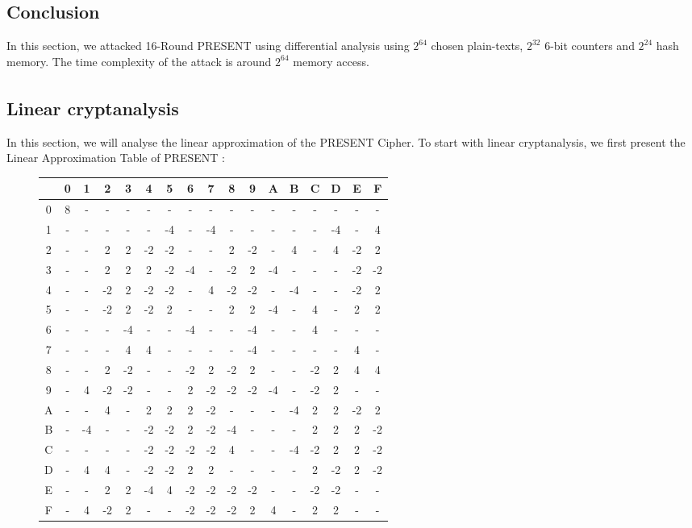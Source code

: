 \documentclass[preprint]{transcrypto}
\begin{document}
\subsection{Conclusion} 
In this section, we attacked 16-Round PRESENT using differential analysis using $2^{64}$ chosen plain-texts, $2^{32}$ 6-bit counters and $2^{24}$ hash memory. The time complexity of the attack is around $2^{64}$ memory access.
\subsection{Linear cryptanalysis \textsuperscript{\cite{3} \cite{10} \cite{1} \cite{2} \cite{6}}}
In this section, we will analyse the linear approximation of the PRESENT Cipher. To start with linear cryptanalysis, we first present the Linear Approximation Table of PRESENT : 
\begin{figure}[h!]
    \centering
    \begin{tabular}{ |c||c|c|c|c|c|c|c|c|c|c|c|c|c|c|c|c| }
        \hline
         & 0 & 1 & 2 & 3&4& 5& 6&7&8&9&A&B&C&D&E&F  \\ \hline \hline
         0& 8 & - & - & - & - & - & - & - & - & - & - & - & - & - & - & - \\ 
         1& - & - & - & - & - & -4 & - & -4 & - & - & - & - & - & -4 & - & 4 \\
         2& - & - & 2 & 2 & -2 & -2 & - & - & 2 & -2 & - & 4 & - & 4 & -2 & 2 \\
         3& - & - & 2 & 2 & 2 & -2 & -4 & - & -2 & 2 & -4 & - & - & - & -2 & -2 \\
         4& - & - & -2 & 2 & -2 & -2 & - & 4 & -2 & -2 & - & -4 & - & - & -2 & 2 \\
         5 & - & - & -2 & 2 & -2 & 2 & - & - & 2 & 2 & -4 & - & 4 & - & 2 & 2\\
         6 & - & - & - & -4 & - & - & -4 & - & - & -4 & - & - & 4 & - & - & -\\
         7 & - & - & - & 4 & 4 & - & - & - & - & -4 & - & - & - & - & 4 & -\\
         8 & - & - & 2 & -2 & - & - & -2 & 2 & -2 & 2 & - & - & -2 & 2 & 4 & 4\\
         9 & - & 4 & -2 & -2 & - & - & 2 & -2 & -2 & -2 & -4 & - & -2 & 2 & - & -\\
         A & - & - & 4 & - & 2 & 2 & 2 & -2 & - & - & - & -4 & 2 & 2 & -2 & 2\\
         B & - & -4 & - & - & -2 & -2 & 2 & -2 & -4 & - & - & - & 2 & 2 & 2 & -2\\
         C & - & - & - & - & -2 & -2 & -2 & -2 & 4 & - & - & -4 & -2 & 2 & 2 & -2\\
         D & - & 4 & 4 & - & -2 & -2 & 2 & 2 & - & - & - & - & 2 & -2 & 2 & -2\\
         E & - & - & 2 & 2 & -4 & 4 & -2 & -2 & -2 & -2 & - & - & -2 & -2 & - & -\\
         F & - & 4 & -2 & 2 & - & - & -2 & -2 & -2 & 2 & 4 & - & 2 & 2 & - & -\\
\hline
    \end{tabular}
    \label{fig2}
\end{figure}
\end{document}
